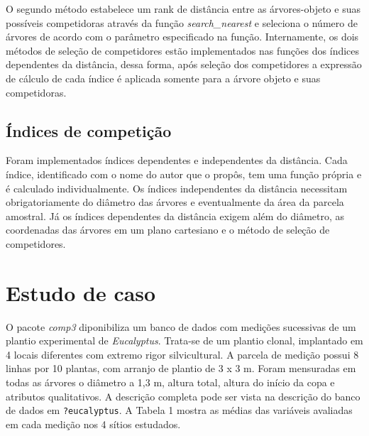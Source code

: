\documentclass[article]{jss}
\begin{document}
O segundo método estabelece um rank de distância entre as árvores-objeto
e suas possíveis competidoras através da função \emph{search\_nearest} e
seleciona o número de árvores de acordo com o parâmetro especificado na
função. Internamente, os dois métodos de seleção de competidores estão
implementados nas funções dos índices dependentes da distância, dessa
forma, após seleção dos competidores a expressão de cálculo de cada
índice é aplicada somente para a árvore objeto e suas competidoras.

\subsection{Índices de competição}\label{indices-de-competicao}

Foram implementados índices dependentes e independentes da distância.
Cada índice, identificado com o nome do autor que o propôs, tem uma
função própria e é calculado individualmente. Os índices independentes
da distância necessitam obrigatoriamente do diâmetro das árvores e
eventualmente da área da parcela amostral. Já os índices dependentes da
distância exigem além do diâmetro, as coordenadas das árvores em um
plano cartesiano e o método de seleção de competidores.

\section{Estudo de caso}\label{estudo-de-caso}

O pacote \emph{comp3} diponibiliza um banco de dados com medições
sucessivas de um plantio experimental de \emph{Eucalyptus}. Trata-se de
um plantio clonal, implantado em 4 locais diferentes com extremo rigor
silvicultural. A parcela de medição possui 8 linhas por 10 plantas, com
arranjo de plantio de 3 x 3 m. Foram mensuradas em todas as árvores o
diâmetro a 1,3 m, altura total, altura do início da copa e atributos
qualitativos. A descrição completa pode ser vista na descrição do banco
de dados em \texttt{?eucalyptus}. A Tabela 1 mostra as médias das
variáveis avaliadas em cada medição nos 4 sítios estudados.
\end{document}
